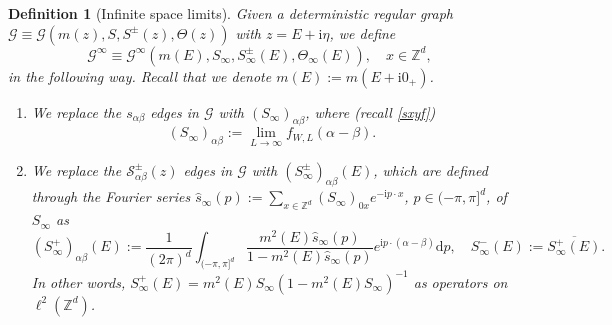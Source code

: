 \documentclass{article}
\newcommand{\1}{\mathds{1}}
\numberwithin{equation}{section}
\newcommand{\al}{\alpha}
\newcommand{\be}{\begin{equation}}
\newcommand{\ee}{\end{equation}}
\renewcommand{\cal}{\mathcal}
\newcommand{\wh}{\widehat}
\newcommand{\ii}{\mathrm{i}} %
\newcommand{\dd}{\mathrm{d}}
\newcommand{\Z}{\mathbb{Z}}
\theoremstyle{plain} %
\newtheorem{definition}[theorem]{Definition}
\theoremstyle{remark}
\newcommand{\Sdelta}{{\Sigma}_T}
\newcommand{\Sinfty}{\Sigma^{\infty}}
\begin{document}
\begin{definition}[Infinite space limits]\label{def infspace}
Given a deterministic regular graph $\cal G\equiv \cal G\left(m(z),S, S^{\pm}(z),\Theta(z)\right)$ with $ z=E+\ii \eta$, we define 
 \be\label{defVnl} \cal G^\infty \equiv  \cal G^\infty \left( m(E), S_\infty ,  S_\infty^{\pm}(E), \Theta_\infty(E)\right), \quad  x\in \Z^d, \ee
in the following way. Recall that we denote $m(E):=m(E+\ii 0_+)$. %
\begin{enumerate}
\item We replace the $s_{\al\beta}$ edges in $\cal G $ with $(S_{\infty})_{\al\beta}$, where (recall \eqref{sxyf})
\be\label{eq_calS}
(S_\infty)_{\al\beta}:= \lim_{L\to \infty} f_{W,L}(\al-\beta).%
\ee


\item We replace the $\cal S^{\pm}_{\al\beta}(z)$ edges in $\cal G $ with $(S_\infty^{\pm})_{\al\beta}(E)$, which are defined through the Fourier series $\wh s_\infty(p):=\sum_{x\in \Z^d}(S_\infty)_{0x}e^{-\ii p\cdot x}$, $p\in (-\pi,\pi]^d$, of $S_\infty$ as
\be\label{eq_Sinftypm} (S_\infty^{+})_{\al\beta}(E):= \frac{1}{(2\pi)^d}\int_{(-\pi,\pi]^d}\frac{m^2(E)\wh s_\infty(p)}{1-m^2(E)\wh s_\infty(p)}e^{\ii p\cdot (\al-\beta)}\dd p,\quad  S_\infty^{-}(E):=\overline {S_\infty^{+}(E)}.
\ee
In other words, $S_\infty^{+}(E)=m^2(E)S_\infty(1-m^2(E)S_\infty)^{-1}$ as operators on $\ell^2(\Z^d)$.


\end{enumerate}
\end{definition}
\end{document}
